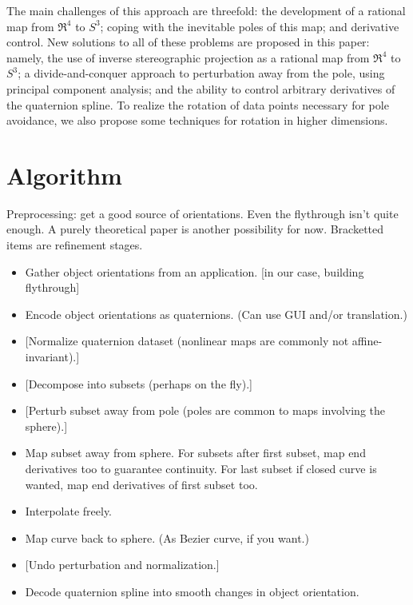 \documentclass[12pt]{article}
\begin{document}
The main challenges of this approach are threefold: the development of a rational map from
$\Re^4$ to $S^3$; coping with the inevitable poles of this map;
and derivative control.
New solutions to all of these problems are proposed in this paper:
namely, the use of inverse stereographic projection as a rational map from 
$\Re^4$ to $S^3$; a divide-and-conquer approach to perturbation away from the pole,
using principal component analysis; 
and the ability to control arbitrary derivatives of the quaternion spline.
To realize the rotation of data points necessary for pole avoidance,
we also propose some techniques for rotation in higher dimensions.

\section{Algorithm}

Preprocessing: get a good source of orientations.
Even the flythrough isn't quite enough.
A purely theoretical paper is another possibility for now.
Bracketted items are refinement stages.

\begin{itemize}
\item Gather object orientations from an application. [in our case, building flythrough]
\item Encode object orientations as quaternions. (Can use GUI and/or translation.)
\item {[Normalize quaternion dataset (nonlinear maps are commonly not affine-invariant).]}
\item {[Decompose into subsets (perhaps on the fly).]}
\item {[Perturb subset away from pole (poles are common to maps involving the sphere).]}
\item Map subset away from sphere.
      For subsets after first subset, map end derivatives too to guarantee continuity.
      For last subset if closed curve is wanted, map end derivatives of first subset too.
\item Interpolate freely.
\item Map curve back to sphere. (As Bezier curve, if you want.)
\item {[Undo perturbation and normalization.]}
\item Decode quaternion spline into smooth changes in object orientation.
\end{itemize}
\end{document}
